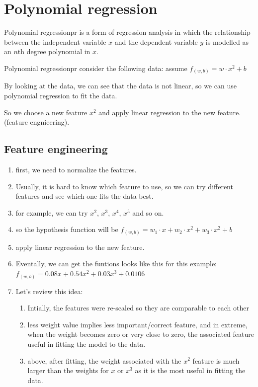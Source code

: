 \section{Polynomial regression}
\begin{dfnbox}{Polynomial regression}{pr}
    \hspace{2em} is a form of regression analysis %
in which the relationship between the independent variable $x$ and the %
dependent variable $y$ is modelled as an $n$th degree polynomial in $x$.
\end{dfnbox}

\begin{exbox}{Polynomial regression}{pr}
    \hspace{2em}consider the following data:
    assume $f_{(w, b)} = w \cdot x^2 + b$\par
    \hspace{2em}By looking at the data, we can see that the data is not linear, so we can use polynomial regression to fit the data.\par
    \hspace{2em}So we choose a new feature $x^2$ and apply linear regression to the new feature.(feature engnieering).
\end{exbox}

\subsection*{Feature engineering}
\begin{enumerate}
    \item first, we need to normalize the features.
    \item Usually, it is hard to know which feature to use, so we can try different features and see which one fits the data best.
    \item for example, we can try $x^2$, $x^3$, $x^4$, $x^5$ and so on.
    \item so the hypothesis function will be $f_{(w, b)} = w_1 \cdot x + w_2 \cdot x^2 + w_3 \cdot x^2 + b$
    \item apply linear regression to the new feature.
    \item Eventally, we can get the funtions looks like this for this example: $ f_{(w, b)} = 0.08x + 0.54x^2 + 0.03x^3 + 0.0106 $
    \item Let's review this idea:
    \begin{enumerate}
        \item Intially, the features were re-scaled so they are comparable to each other
        \item less weight value implies less important/correct feature, and in extreme, when the weight becomes zero or very close to zero, the associated feature useful in fitting the model to the data.
        \item above, after fitting, the weight associated with the $x^2$ feature is much larger than the weights for $x$ or $x^3$ as it is the most useful in fitting the data. 
    \end{enumerate}
\end{enumerate}

